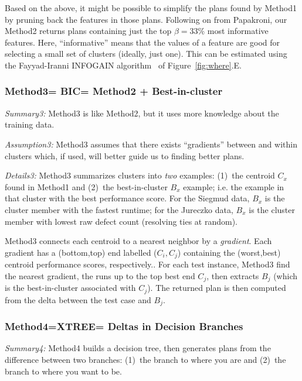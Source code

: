 \documentclass{sig-alternate}
\newcommand{\fig}[1]{Figure~\ref{fig:#1}}
\begin{document}
Based on the above, it might be possible to simplify the plans found by Method1  by pruning back the features in those
 plans. Following on from Papakroni, our Method2 returns plans
containing just the top $\beta=33\%$ most informative features. Here, ``informative'' means
that the values of a feature are good for selecting a small set of clusters (ideally,
just one).
This can be estimated using the Fayyad-Iranni INFOGAIN algorithm~\cite{FayIra93Multi}
of \fig{where}.E.
 
 
 
\subsubsection{Method3= BIC=   Method2 + Best-in-cluster}\label{sect:BIC}

{\em Summary3:} Method3 is like Method2, but it uses more knowledge about the training data.

{\em Assumption3: } Method3 assumes that there exists ``gradients'' between and
within clusters which, if used, will better guide us to finding better plans.

{\em Details3:}
Method3 summarizes clusters into {\em two} examples: (1)~the centroid $C_x$ found in Method1 and
(2)~the best-in-cluster $B_x$  example; i.e. the  example in that cluster
with the best performance score. 
For the Siegmud data, $B_x$ is the cluster member with the fastest runtime;
for the Jureczko data, $B_x$  is the cluster member with lowest raw defect count
(resolving ties at random).

Method3 connects  each centroid to a nearest neighbor
by a {\em gradient}.
Each gradient has a (bottom,top) end labelled  ($C_i,C_j$) containing the  (worst,best) centroid performance scores, respectively..  
For each test instance, Method3 
find the nearest gradient, the runs up to the top  best end $C_j$, then extracts $B_j$ (which is the
 best-in-cluster associated with  $C_j$).
The returned plan is then computed  from the delta between the test case
and $B_j$.
 
%




\subsubsection{Method4=XTREE=  Deltas in Decision   Branches}

{\em Summary4:} Method4 builds a decision tree,  then generates
plans from the difference between two branches:
(1)~the branch to where you are and (2)~the branch to where you want to be.
\end{document}

